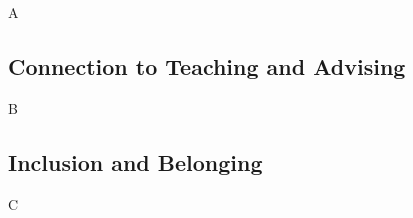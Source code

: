 \documentclass[../../../main.tex]{subfiles}
\begin{document}
A

\subsection{Connection to Teaching and Advising}

B

\subsection{Inclusion and Belonging}

C
\end{document}
